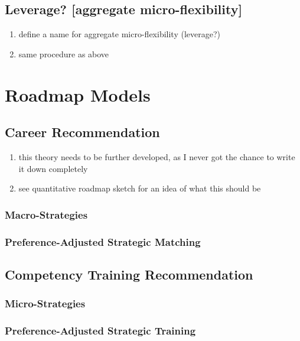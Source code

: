 \documentclass{elsarticle} %
\begin{document}
\subsection{Leverage? [aggregate micro-flexibility]}
\begin{enumerate}
    \item define a name for aggregate micro-flexibility (leverage?)
    \item same procedure as above
\end{enumerate}


\section{Roadmap Models}
\subsection{Career Recommendation}
\begin{enumerate}
    \item this theory needs to be further developed, as I never got the chance to write
          it down completely
    \item see quantitative roadmap sketch for an idea of what this should be
\end{enumerate}

\subsubsection{Macro-Strategies}
\subsubsection{Preference-Adjusted Strategic Matching}

\subsection{Competency Training Recommendation}
\subsubsection{Micro-Strategies}
\subsubsection{Preference-Adjusted Strategic Training}
\end{document}
